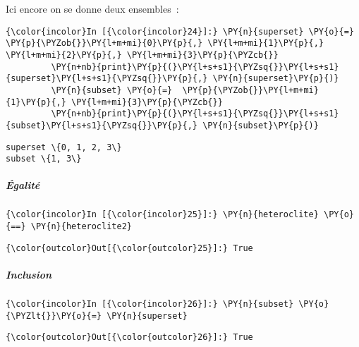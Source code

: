     Ici encore on se donne deux ensembles~:

    \begin{Verbatim}[commandchars=\\\{\},frame=single,framerule=0.3mm,rulecolor=\color{cellframecolor}]
{\color{incolor}In [{\color{incolor}24}]:} \PY{n}{superset} \PY{o}{=} \PY{p}{\PYZob{}}\PY{l+m+mi}{0}\PY{p}{,} \PY{l+m+mi}{1}\PY{p}{,} \PY{l+m+mi}{2}\PY{p}{,} \PY{l+m+mi}{3}\PY{p}{\PYZcb{}}
         \PY{n+nb}{print}\PY{p}{(}\PY{l+s+s1}{\PYZsq{}}\PY{l+s+s1}{superset}\PY{l+s+s1}{\PYZsq{}}\PY{p}{,} \PY{n}{superset}\PY{p}{)}
         \PY{n}{subset} \PY{o}{=}  \PY{p}{\PYZob{}}\PY{l+m+mi}{1}\PY{p}{,} \PY{l+m+mi}{3}\PY{p}{\PYZcb{}}
         \PY{n+nb}{print}\PY{p}{(}\PY{l+s+s1}{\PYZsq{}}\PY{l+s+s1}{subset}\PY{l+s+s1}{\PYZsq{}}\PY{p}{,} \PY{n}{subset}\PY{p}{)}
\end{Verbatim}


    \begin{Verbatim}[commandchars=\\\{\},frame=single,framerule=0.3mm,rulecolor=\color{cellframecolor}]
superset \{0, 1, 2, 3\}
subset \{1, 3\}
\end{Verbatim}

    \hypertarget{uxe9galituxe9}{%
\subparagraph{Égalité}\label{uxe9galituxe9}}

    \begin{Verbatim}[commandchars=\\\{\},frame=single,framerule=0.3mm,rulecolor=\color{cellframecolor}]
{\color{incolor}In [{\color{incolor}25}]:} \PY{n}{heteroclite} \PY{o}{==} \PY{n}{heteroclite2}
\end{Verbatim}


\begin{Verbatim}[commandchars=\\\{\},frame=single,framerule=0.3mm,rulecolor=\color{cellframecolor}]
{\color{outcolor}Out[{\color{outcolor}25}]:} True
\end{Verbatim}
            
    \hypertarget{inclusion}{%
\subparagraph{Inclusion}\label{inclusion}}

    \begin{Verbatim}[commandchars=\\\{\},frame=single,framerule=0.3mm,rulecolor=\color{cellframecolor}]
{\color{incolor}In [{\color{incolor}26}]:} \PY{n}{subset} \PY{o}{\PYZlt{}}\PY{o}{=} \PY{n}{superset}
\end{Verbatim}


\begin{Verbatim}[commandchars=\\\{\},frame=single,framerule=0.3mm,rulecolor=\color{cellframecolor}]
{\color{outcolor}Out[{\color{outcolor}26}]:} True
\end{Verbatim}
            
